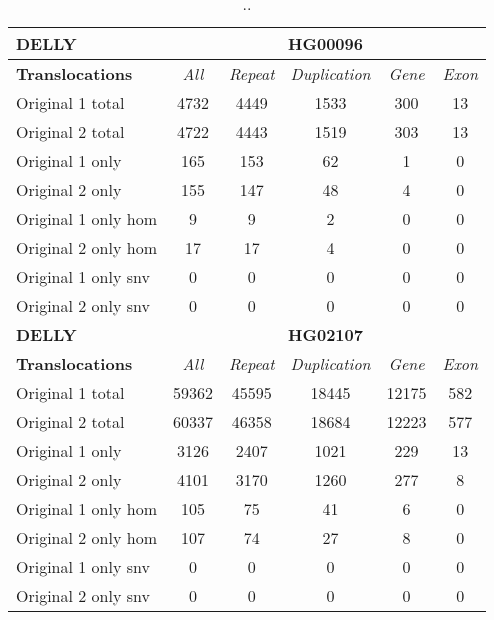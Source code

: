 \begin{table}[htb]
\begin{center}
\begin{tabular}{|l|c||c|c|c|c|}
\hline
{\bf DELLY} & \multicolumn{5}{|c|}{\bf HG00096} \\
\hline
\cline{2-6}
{\bf Translocations} & {\it All} & {\it Repeat} & {\it Duplication} & {\it Gene} & {\it Exon} \\
\hline
Original 1 total & 4732 & 4449 & 1533 & 300 & 13\\ 
\hline
Original 2 total & 4722 & 4443 & 1519 & 303 & 13\\ 
\hline
Original 1 only & 165 & 153 & 62 & 1 & 0\\ 
\hline
Original 2 only & 155 & 147 & 48 & 4 & 0\\ 
\hline
Original 1 only hom & 9 & 9 & 2 & 0 & 0\\ 
\hline
Original 2 only hom & 17 & 17 & 4 & 0 & 0\\ 
\hline
Original 1 only snv & 0 & 0 & 0 & 0 & 0\\ 
\hline
Original 2 only snv & 0 & 0 & 0 & 0 & 0\\ 
\hline
\hline
{\bf DELLY} & \multicolumn{5}{|c|}{\bf HG02107} \\
\hline
\cline{2-6}
{\bf Translocations} & {\it All} & {\it Repeat} & {\it Duplication} & {\it Gene} & {\it Exon} \\
\hline
Original 1 total & 59362 & 45595 & 18445 & 12175 & 582\\ 
\hline
Original 2 total & 60337 & 46358 & 18684 & 12223 & 577\\ 
\hline
Original 1 only & 3126 & 2407 & 1021 & 229 & 13\\ 
\hline
Original 2 only & 4101 & 3170 & 1260 & 277 & 8\\ 
\hline
Original 1 only hom & 105 & 75 & 41 & 6 & 0\\ 
\hline
Original 2 only hom & 107 & 74 & 27 & 8 & 0\\ 
\hline
Original 1 only snv & 0 & 0 & 0 & 0 & 0\\ 
\hline
Original 2 only snv & 0 & 0 & 0 & 0 & 0\\ 
\hline
\end{tabular}
\end{center}
\caption{ .. }
\label{tab:orig-vs-shuf-delly-trans}
\end{table}
